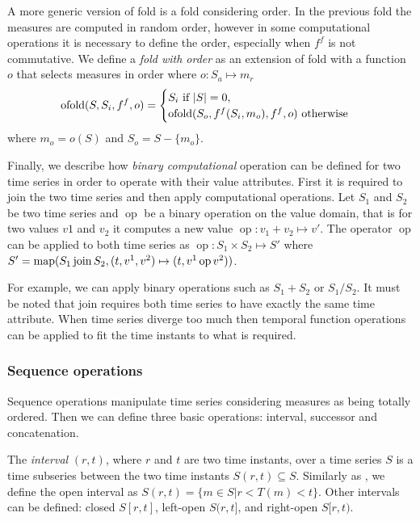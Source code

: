 A more generic version of fold is a fold considering order. In the
previous fold the measures are computed in random order, however in
some computational operations it is necessary to define the order,
especially when $f^f$ is not commutative. We define a \emph{fold with
  order} as an extension of fold with a function $o$ that selects
measures in order where $o: S_a \mapsto m_r$
\[
 \operatorname*{ofold}(S,S_i,f^f,o) =
  \begin{cases}
    S_i  \text{ if } |S|=0, \\
    \operatorname*{ofold}(S_o,f^f(S_i,m_o),f^f,o)  \text{ otherwise}
  \end{cases}
\]
 where $m_o = o(S)$ and $S_o = S - \{m_o\}$.


Finally, we describe how \emph{binary computational} operation can be defined
for two time series in order to operate with their value attributes.
First it is required to join the two time series and then apply
computational operations. Let $S_1$ and $S_2$ be two time series and
$\operatorname{op}$ be a binary operation on the value domain, that is
for two values $v1$ and $v_2$ it computes a new value
$\operatorname{op}: v_1 + v_2 \mapsto v'$. The operator
$\operatorname{op}$ can be applied to both time series as
$\operatorname{op}: S_1 \times S_2 \mapsto S'$ where $S' =
\operatorname*{map}(S_1 \operatorname*{join} S_2, (t,v^1,v^2)\mapsto(t,v^1 \operatorname{op} v^2))$.

For example, we can apply binary operations such as $S_1 + S_2$ or
$S_1 / S_2$. It must be noted that join requires both time series to
have exactly the same time attribute. When time series diverge too
much then temporal function operations can be applied to fit the time
instants to what is required.





\subsubsection{Sequence operations}

Sequence operations manipulate time series considering measures as
being totally ordered. Then we can define three basic operations:
interval, successor and concatenation.


The \emph{interval} $(r,t)$, where $r$ and $t$ are two time instants,
over a time series $S$ is a time subseries between the two time
instants $S(r,t) \subseteq S$. Similarly as \cite{last:hetland}, we
define the open interval as $S(r,t)=\{m\in S | r<T(m)<t\}$. Other
intervals can be defined: closed $S[r,t]$, left-open $S(r,t]$, and
right-open $S[r,t)$.

